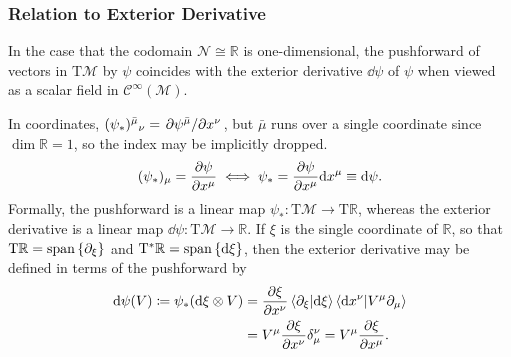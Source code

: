 \documentclass[a5paper]{article}
\newcommand{\M}{\mathcal{M}}
\newcommand{\N}{\mathcal{N}}
\newcommand{\T}{\mathrm{T}}
\newcommand{\R}{\mathbb{R}}
\newcommand{\Cinf}{\mathcal{C}^\infty}
\begin{document}
\subsubsection*{Relation to Exterior Derivative}


In the case that the codomain $\N \cong \R$ is one-dimensional, the pushforward of vectors in $\T\M$ by $\psi$ coincides with the exterior derivative $\dd\psi$ of $\psi$ when viewed as a scalar field in $\Cinf(\M)$.

In coordinates, $(\psi_*)^{\bar\mu}{}_\nu = \pdv*{\psi^{\bar\mu}}{x^\nu}$, but $\bar\mu$ runs over a single coordinate since $\dim\R = 1$, so the index may be implicitly dropped.
\begin{align}
	(\psi_*)_\mu = \pdv{\psi}{x^\mu}
	\iff
	\psi_* = \pdv{\psi}{x^\mu}\dd x^\mu \equiv \dd\psi
.\end{align}
Formally, the pushforward is a linear map $\psi_* : \T\M \to \T\R$, whereas the exterior derivative is a linear map $\dd\psi : \T\M \to \R$.
If $\xi$ is the single coordinate of $\R$, so that $\T\R = \operatorname{span}\qty{\partial_\xi}$ and $\T^*\R = \operatorname{span}\qty{\dd\xi}$, then the exterior derivative may be defined in terms of the pushforward by
\begin{align}
	\dd\psi(V) \coloneqq \psi_*(\dd\xi \otimes V)
	&= \pdv{\xi}{x^\nu} \braket{\partial_\xi}{\dd\xi} \braket{\dd x^\nu}{V^\mu\partial_\mu}
\\	&= V^\mu\pdv{\xi}{x^\nu} \delta^\nu_\mu
	= V^\mu\pdv{\xi}{x^\mu}
.\end{align}
%
%
\end{document}
